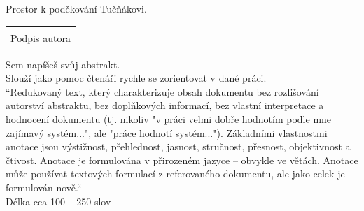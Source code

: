 \documentclass[12pt, a4paper,
twoside,        %
openright
]{report}
\newcommand\datumOdevzdani{1. 1. 2024} %
\begin{document}
\cleardoublepage %
	

	
	\noindent Prostor k poděkování Tučňákovi.
	
	\vspace*{0.7\textheight} %

	\vfill
	\noindent{V Opavě \datumOdevzdani\\}
	\noindent
	\begin{minipage}{\linewidth}
		\hspace{9.5cm} 
		\begin{tabular}{@{}p{6cm}@{}}
			\dotfill \\
			Podpis autora
		\end{tabular}
	\end{minipage}
	
	\cleardoublepage %


	\noindent Sem napíšeš svůj abstrakt.\\
	Slouží jako pomoc čtenáři rychle se zorientovat v dané práci.\\
	“Redukovaný text, který charakterizuje obsah dokumentu bez rozlišování autorství abstraktu, bez doplňkových informací, bez vlastní interpretace a hodnocení dokumentu (tj. nikoliv "v práci velmi dobře hodnotím podle mne zajímavý systém...", ale "práce hodnotí systém..."). Základními vlastnostmi anotace jsou výstižnost, přehlednost, jasnost, stručnost, přesnost, objektivnost a čtivost. Anotace je formulována v přirozeném jazyce – obvykle ve větách. Anotace může používat textových formulací z referovaného dokumentu, ale jako celek je formulován nově.“\\
	Délka cca 100 – 250 slov
	
\end{document}
